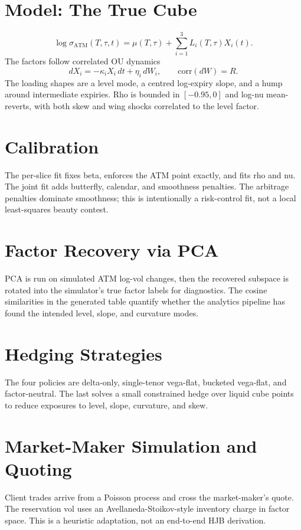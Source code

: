 \documentclass[11pt]{article}
\begin{document}
\section{Model: The True Cube}
\[
\log \sigma_{\mathrm{ATM}}(T,\tau,t)=\mu(T,\tau)+
  \sum_{i=1}^3 L_i(T,\tau)X_i(t).
\]
The factors follow correlated OU dynamics
\[
dX_i=-\kappa_i X_i\,dt+\eta_i\,dW_i,\qquad
\mathrm{corr}(dW)=R.
\]
The loading shapes are a level mode, a centred log-expiry slope, and a hump
around intermediate expiries.  Rho is bounded in $[-0.95,0]$ and log-nu
mean-reverts, with both skew and wing shocks correlated to the level factor.

\section{Calibration}
The per-slice fit fixes beta, enforces the ATM point exactly, and fits rho and
nu.  The joint fit adds butterfly, calendar, and smoothness penalties.  The
arbitrage penalties dominate smoothness; this is intentionally a risk-control
fit, not a local least-squares beauty contest.

\section{Factor Recovery via PCA}
PCA is run on simulated ATM log-vol changes, then the recovered subspace is
rotated into the simulator's true factor labels for diagnostics.  The cosine
similarities in the generated table quantify whether the analytics pipeline has
found the intended level, slope, and curvature modes.

\section{Hedging Strategies}
The four policies are delta-only, single-tenor vega-flat, bucketed vega-flat, and
factor-neutral.  The last solves a small constrained hedge over liquid cube
points to reduce exposures to level, slope, curvature, and skew.

\section{Market-Maker Simulation and Quoting}
Client trades arrive from a Poisson process and cross the market-maker's quote.
The reservation vol uses an Avellaneda-Stoikov-style inventory charge in factor
space.  This is a heuristic adaptation, not an end-to-end HJB derivation.
\end{document}
